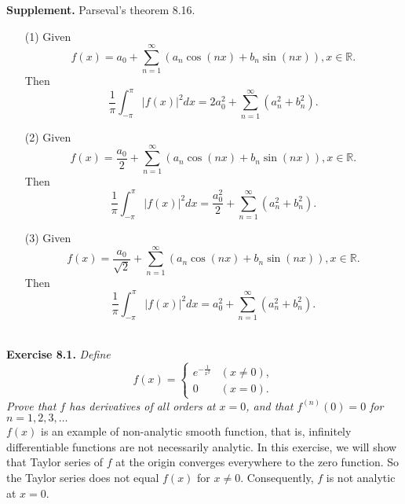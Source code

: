 \documentclass{article}
\begin{document}
\textbf{Supplement.} Parseval's theorem 8.16.
\begin{enumerate}
\item[(1)]
Given $$f(x) = a_0 + \sum_{n = 1}^{\infty}(a_n \cos(nx) + b_n \sin(nx)),
x \in \mathbb{R}.$$
Then
$$\frac{1}{\pi} \int_{-\pi}^\pi |f(x)|^2 dx
= 2 a_0^2 + \sum_{n = 1}^{\infty}(a_n^2 + b_n^2).$$
\item[(2)]
Given $$f(x) = \frac{a_0}{2} + \sum_{n = 1}^{\infty}(a_n \cos(nx) + b_n \sin(nx)),
x \in \mathbb{R}.$$
Then
$$\frac{1}{\pi} \int_{-\pi}^\pi |f(x)|^2 dx
= \frac{a_0^2}{2} + \sum_{n = 1}^{\infty}(a_n^2 + b_n^2).$$
\item[(3)]
Given $$f(x) = \frac{a_0}{\sqrt{2}} + \sum_{n = 1}^{\infty}(a_n \cos(nx) + b_n \sin(nx)),
x \in \mathbb{R}.$$
Then
$$\frac{1}{\pi} \int_{-\pi}^\pi |f(x)|^2 dx
= a_0^2 + \sum_{n = 1}^{\infty}(a_n^2 + b_n^2).$$ \\
\end{enumerate}






\textbf{Exercise 8.1.}
\emph{Define
\begin{equation*}
  f(x) =
    \begin{cases}
      e^{-\frac{1}{x^2}} & (x \neq 0), \\
      0                  & (x = 0).
    \end{cases}
\end{equation*}
Prove that $f$ has derivatives of all orders at $x = 0$,
and that $f^{(n)}(0) = 0$ for $n = 1,2,3,\ldots$} \\

$f(x)$ is an example of non-analytic smooth function, that is,
infinitely differentiable functions are not necessarily analytic.
In this exercise, we will show that Taylor series of $f$ at the origin
converges everywhere to the zero function.
So the Taylor series does not equal $f(x)$ for $x \neq 0$.
Consequently, $f$ is not analytic at $x = 0$. \\
\end{document}
